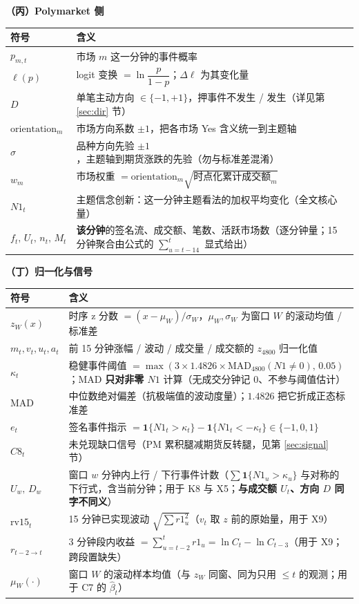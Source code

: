 \smallskip\noindent\textbf{（丙）Polymarket 侧}
\nopagebreak
\begin{center}\footnotesize\setlength{\tabcolsep}{5pt}
\begin{tabular}{lp{11.2cm}}
\toprule
符号 & 含义 \\
\midrule
$p_{m,t}$ & 市场 $m$ 这一分钟的事件概率 \\
$\ell(p)$ & logit 变换 $=\ln\dfrac{p}{1-p}$；$\Delta\ell$ 为其变化量 \\
$D$ & 单笔主动方向 $\in\{-1,+1\}$，押事件不发生 / 发生（详见第 \ref{sec:dir} 节） \\
$\mathrm{orientation}_m$ & 市场方向系数 $\pm1$，把各市场 Yes 含义统一到主题轴 \\
$\sigma$ & 品种方向先验 $\pm1$，主题轴到期货涨跌的先验（勿与标准差混淆） \\
$w_m$ & 市场权重 $=\mathrm{orientation}_m\sqrt{\text{时点化累计成交额}_m}$ \\
$N1_t$ & 主题信念创新：这一分钟主题看法的加权平均变化（全文核心量） \\
$f_t,\,U_t,\,n_t,\,M_t$ & \textbf{该分钟}的签名流、成交额、笔数、活跃市场数（逐分钟量；15 分钟聚合由公式的 $\sum_{u=t-14}^{t}$ 显式给出） \\
\bottomrule
\end{tabular}
\end{center}

\smallskip\noindent\textbf{（丁）归一化与信号}
\nopagebreak
\begin{center}\footnotesize\setlength{\tabcolsep}{5pt}
\begin{tabular}{lp{11.2cm}}
\toprule
符号 & 含义 \\
\midrule
$z_W(x)$ & 时序 z 分数 $=(x-\mu_W)/\sigma_W$，$\mu_W,\sigma_W$ 为窗口 $W$ 的滚动均值 / 标准差 \\
$m_t,v_t,u_t,a_t$ & 前 15 分钟涨幅 / 波动 / 成交量 / 成交额的 $z_{4800}$ 归一化值 \\
$\kappa_t$ & 稳健事件阈值 $=\max(3\times1.4826\times\mathrm{MAD}_{4800}(N1\neq0),\,0.05)$；MAD \textbf{只对非零 $N1$} 计算（无成交分钟记 0、不参与阈值估计） \\
$\mathrm{MAD}$ & 中位数绝对偏差（抗极端值的波动度量）；$1.4826$ 把它折成正态标准差 \\
$e_t$ & 签名事件指示 $=\mathbf{1}\{N1_t>\kappa_t\}-\mathbf{1}\{N1_t<-\kappa_t\}\in\{-1,0,1\}$ \\
$C8_t$ & 未兑现缺口信号（PM 累积腿减期货反转腿，见第 \ref{sec:signal} 节） \\
$U_w,\,D_w$ & 窗口 $w$ 分钟内上行 / 下行事件计数（$\sum\mathbf{1}\{N1_u>\kappa_u\}$ 与对称的下行式，含当前分钟；用于 K8 与 X5；\textbf{与成交额 $U_t$、方向 $D$ 同字不同义}） \\
$\mathrm{rv}15_t$ & 15 分钟已实现波动 $\sqrt{\sum r1_u^2}$（$v_t$ 取 $z$ 前的原始量，用于 X9） \\
$r_{t-2\to t}$ & 3 分钟段内收益 $=\sum_{u=t-2}^{t}r1_u=\ln C_t-\ln C_{t-3}$（用于 X9；跨段置缺失） \\
$\mu_W(\cdot)$ & 窗口 $W$ 的滚动样本均值（与 $z_W$ 同窗、同为只用 $\le t$ 的观测；用于 C7 的 $\hat\beta_t$） \\
\bottomrule
\end{tabular}
\end{center}

